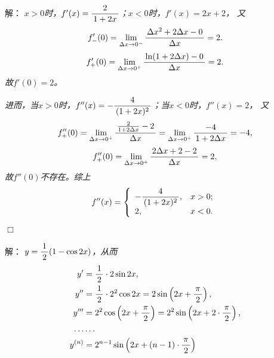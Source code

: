 \begin{frame}
	\linespread{1.5}
	\pause
	
	\bigskip
	
	\small 解：\it 
	$x>0$时，$f'(x)=\displaystyle\frac{\,{2}\,}{\,{1+2x}\,}$；$x<0$时，$f'(x)=2x+2$，
	\pause 又
	$$f'_-(0)=\lim\limits_{\Delta x\to0^-}\displaystyle\frac{\,{\Delta x^2+2\Delta x-0}\,}{\,{\Delta x}\,}=2.$$
	$$f'_+(0)=\lim\limits_{\Delta x\to0^+}\displaystyle\frac{\,{\ln(1+2\Delta x)-0}\,}{\,{\Delta x}\,}=2.$$
	故$f'(0)=2$。
\end{frame}

\begin{frame}
	\linespread{1.5}
	
	
	\small \it 
	进而，当$x>0$时，$f''(x)=-\displaystyle\frac{\,{4}\,}{\,{(1+2x)^2}\,}$；当$x<0$时，$f''(x)=2$，
	\pause 又
	$$f''_+(0)=\lim\limits_{\Delta x\to0^+}
	\displaystyle\frac{\,{\frac2{1+2\Delta x}-2}\,}{\,{\Delta x}\,}
	=\lim\limits_{\Delta x\to0^+}
	\displaystyle\frac{\,{-4}\,}{\,{1+2\Delta x}\,}=-4,$$
	$$f''_+(0)=\lim\limits_{\Delta x\to0^+}
	\displaystyle\frac{\,{2\Delta x+2-2}\,}{\,{\Delta x}\,}=2,
	$$
	故$f''(0)$不存在。综上
	$$f''(x)=\left\{\begin{array}{ll}
		-\displaystyle\frac{\,{4}\,}{\,{(1+2x)^2}\,}, & x>0;\\
		2, & x<0.
	\end{array}\right.$$
	\hfill$\Box$
\end{frame}

\begin{frame}
	\linespread{1.5}
	\pause
	
	\bigskip
	
	\small 解：\it
	$y=\displaystyle\frac{\,{1}\,}{\,{2}\,}(1-\cos2x)$，从而
	\begin{align*}
		y'&=\displaystyle\frac{\,{1}\,}{\,{2}\,}\cdot 2\sin2x,\\
		y''&=\displaystyle\frac{\,{1}\,}{\,{2}\,}\cdot 2^2\cos2x=2\sin\left(2x+\displaystyle\frac{\,{\pi}\,}{\,{2}\,}\right),\\
		y'''&=2^2\cos\left(2x+\displaystyle\frac{\,{\pi}\,}{\,{2}\,}\right)=2^2\sin\left(2x+2\cdot\displaystyle\frac{\,{\pi}\,}{\,{2}\,}\right),\\
		\ldots&\ldots\\
		y^{(n)}&=2^{n-1}\sin\left(2x+(n-1)\cdot\displaystyle\frac{\,{\pi}\,}{\,{2}\,}\right)
	\end{align*}
\end{frame}

